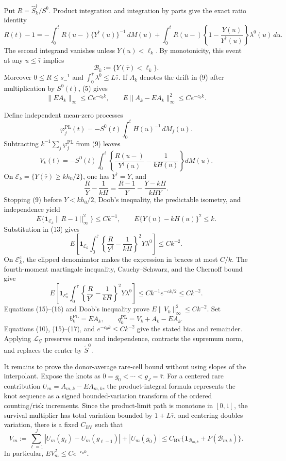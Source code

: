 Put \(R=\widehat S_k^\dagger/S^0\). Product integration and integration by parts give the exact ratio identity
\[
 R(t)-1=-\int_0^tR(u-)\{Y^\dagger(u)\}^{-1}\,dM(u)
 +\int_0^tR(u-)\left\{1-\frac{Y(u)}{Y^\dagger(u)}\right\}
          \lambda^0(u)\,du.                              \tag{9}
\]
The second integrand vanishes unless \(Y(u)<\ell_k\). By monotonicity, this event at any \(u\le\bar\tau\) implies
\[
 \mathcal B_k:=\{Y(\bar\tau)<\ell_k\}.
\]
Moreover \(0\le R\le s_-^{-1}\) and \(\int_0^{\bar\tau}\lambda^0\le L\bar\tau\). If \(A_k\) denotes the drift in (9) after multiplication by \(S^0(t)\), (5) gives
\[
 \|EA_k\|_\infty\le Ce^{-c_0k},
 \qquad E\|A_k-EA_k\|_\infty^2\le Ce^{-c_0k}.           \tag{10}
\]

Define independent mean-zero processes
\[
 \varphi_j^{\mathrm{PL}}(t)
 =-S^0(t)\int_0^tH(u)^{-1}\,dM_j(u).                     \tag{11}
\]
Subtracting \(k^{-1}\sum_j\varphi_j^{\mathrm{PL}}\) from (9) leaves
\[
 V_k(t)=-S^0(t)\int_0^t
 \left\{\frac{R(u-)}{Y^\dagger(u)}-\frac1{kH(u)}\right\}
 dM(u).                                                    \tag{12}
\]
On \(\mathcal E_k=\{Y(\bar\tau)\ge kh_0/2\}\), one has \(Y^\dagger=Y\), and
\[
 \frac{R}{Y}-\frac1{kH}
 =\frac{R-1}{Y}-\frac{Y-kH}{kHY}.                         \tag{13}
\]
Stopping (9) before \(Y<kh_0/2\), Doob's inequality, the predictable isometry, and independence yield
\[
 E\{\mathbf1_{\mathcal E_k}\|R-1\|_\infty^2\}\le Ck^{-1},
 \qquad E\{Y(u)-kH(u)\}^2\le k.                         \tag{14}
\]
Substitution in (13) gives
\[
 E\left[\mathbf1_{\mathcal E_k}\int_0^{\bar\tau}
 \left\{\frac{R}{Y^\dagger}-\frac1{kH}\right\}^2
 Y\lambda^0\right]\le Ck^{-2}.                          \tag{15}
\]
On \(\mathcal E_k^c\), the clipped denominator makes the expression in braces at most \(C/k\). The fourth-moment martingale inequality, Cauchy--Schwarz, and the Chernoff bound give
\[
 E\left[\mathbf1_{\mathcal E_k^c}\int_0^{\bar\tau}
 \left\{\frac{R}{Y^\dagger}-\frac1{kH}\right\}^2
 Y\lambda^0\right]
 \le Ck^{-1}e^{-ck/2}\le Ck^{-2}.                        \tag{16}
\]
Equations (15)--(16) and Doob's inequality prove \(E\|V_k\|_\infty^2\le Ck^{-2}\). Set
\[
 b_k^{\mathrm{PL}}=EA_k,\qquad
 q_k^{\mathrm{PL}}=V_k+A_k-EA_k.                         \tag{17}
\]
Equations (10), (15)--(17), and \(e^{-c_0k}\le Ck^{-2}\) give the stated bias and remainder. Applying \(\mathcal L_{\mathcal G}\) preserves means and independence, contracts the supremum norm, and replaces the center by \(\widetilde S^0\).

It remains to prove the donor-average rare-cell bound without using slopes of the interpolant. Expose the knots as \(0=g_0<\cdots<g_J=\bar\tau\). For a centered rare contribution \(U_m=A_{m,k}-EA_{m,k}\), the product-integral formula represents the knot sequence as a signed bounded-variation transform of the ordered counting/risk increments. Since the product-limit path is monotone in \([0,1]\), the survival multiplier has total variation bounded by \(1+L\bar\tau\), and centering doubles variation, there is a fixed \(C_{\mathrm{BV}}\) such that
\[
 V_m:=\sum_{\ell=1}^J|U_m(g_\ell)-U_m(g_{\ell-1})|
       +|U_m(g_0)|
 \le C_{\mathrm{BV}}\{\mathbf1_{\mathcal B_{m,k}}+P(\mathcal B_{m,k})\}. \tag{18}
\]
In particular, \(EV_m^2\le Ce^{-c_0k}\).

